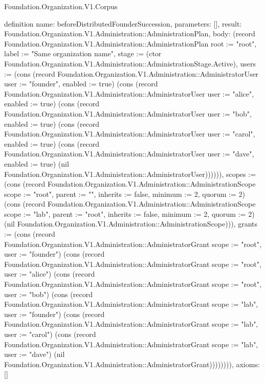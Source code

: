 \begin{lexlean}{Foundation.Organization.V1.Corpus}
\begin{semanticmodule}
definition{
  name: beforeDistributedFounderSuccession,
  parameters: [],
  result: Foundation.Organization.V1.Administration::AdministrationPlan,
  body: (record Foundation.Organization.V1.Administration::AdministrationPlan {root := "root", label := "Same organization name", stage := (ctor Foundation.Organization.V1.Administration::AdministrationStage.Active), users := (cons (record Foundation.Organization.V1.Administration::AdministratorUser {user := "founder", enabled := true}) (cons (record Foundation.Organization.V1.Administration::AdministratorUser {user := "alice", enabled := true}) (cons (record Foundation.Organization.V1.Administration::AdministratorUser {user := "bob", enabled := true}) (cons (record Foundation.Organization.V1.Administration::AdministratorUser {user := "carol", enabled := true}) (cons (record Foundation.Organization.V1.Administration::AdministratorUser {user := "dave", enabled := true}) (nil Foundation.Organization.V1.Administration::AdministratorUser)))))), scopes := (cons (record Foundation.Organization.V1.Administration::AdministrationScope {scope := "root", parent := "", inherits := false, minimum := 2, quorum := 2}) (cons (record Foundation.Organization.V1.Administration::AdministrationScope {scope := "lab", parent := "root", inherits := false, minimum := 2, quorum := 2}) (nil Foundation.Organization.V1.Administration::AdministrationScope))), grants := (cons (record Foundation.Organization.V1.Administration::AdministratorGrant {scope := "root", user := "founder"}) (cons (record Foundation.Organization.V1.Administration::AdministratorGrant {scope := "root", user := "alice"}) (cons (record Foundation.Organization.V1.Administration::AdministratorGrant {scope := "root", user := "bob"}) (cons (record Foundation.Organization.V1.Administration::AdministratorGrant {scope := "lab", user := "founder"}) (cons (record Foundation.Organization.V1.Administration::AdministratorGrant {scope := "lab", user := "carol"}) (cons (record Foundation.Organization.V1.Administration::AdministratorGrant {scope := "lab", user := "dave"}) (nil Foundation.Organization.V1.Administration::AdministratorGrant)))))))}),
  axioms: []
}


\end{semanticmodule}
\end{lexlean}
